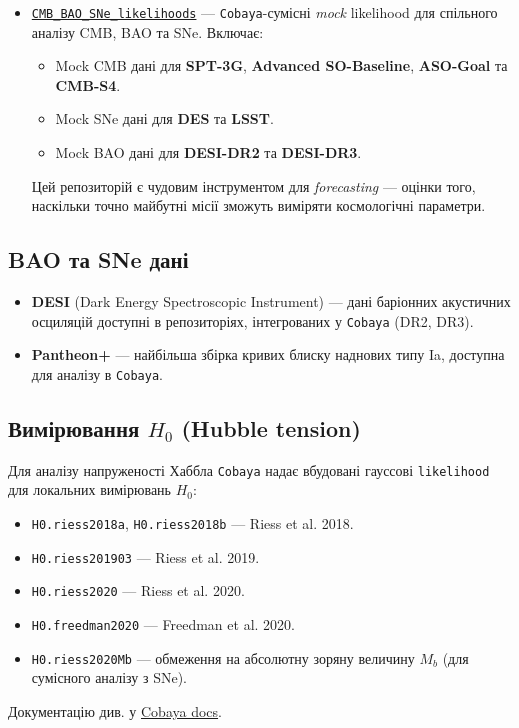 \begin{itemize}
    \item \href{https://github.com/sriniraghunathan/CMB_BAO_SNe_likelihoods}{\texttt{CMB\_BAO\_SNe\_likelihoods}} ---
          \texttt{Cobaya}-сумісні \emph{mock} likelihood для спільного
          аналізу CMB, BAO та SNe. Включає:
          \begin{itemize}
              \item Mock CMB дані для \textbf{SPT-3G}, \textbf{Advanced SO-Baseline},
                    \textbf{ASO-Goal} та \textbf{CMB-S4}.
              \item Mock SNe дані для \textbf{DES} та \textbf{LSST}.
              \item Mock BAO дані для \textbf{DESI-DR2} та \textbf{DESI-DR3}.
          \end{itemize}
          Цей репозиторій є чудовим інструментом для \emph{forecasting} ---
          оцінки того, наскільки точно майбутні місії зможуть виміряти
          космологічні параметри. \cite{raghunathan_2025}
\end{itemize}

\subsection*{BAO та SNe дані}

\begin{itemize}
    \item \textbf{DESI} (Dark Energy Spectroscopic Instrument) ---
          дані баріонних акустичних осциляцій доступні в репозиторіях,
          інтегрованих у \texttt{Cobaya} (DR2, DR3).

    \item \textbf{Pantheon+} --- найбільша збірка кривих блиску наднових
          типу Ia, доступна для аналізу в \texttt{Cobaya}.
\end{itemize}

\subsection*{Вимірювання $H_0$ (Hubble tension)}

Для аналізу напруженості Хаббла \texttt{Cobaya} надає вбудовані
гауссові \texttt{likelihood} для локальних вимірювань $H_0$:
\begin{itemize}
    \item \texttt{H0.riess2018a}, \texttt{H0.riess2018b} --- Riess et al. 2018.
    \item \texttt{H0.riess201903} --- Riess et al. 2019.
    \item \texttt{H0.riess2020} --- Riess et al. 2020.
    \item \texttt{H0.freedman2020} --- Freedman et al. 2020.
    \item \texttt{H0.riess2020Mb} --- обмеження на абсолютну зоряну
          величину $M_b$ (для сумісного аналізу з SNe).
\end{itemize}
Документацію див. у \href{https://cobaya.readthedocs.io/en/latest/likelihood_H0.html}{Cobaya docs}.

